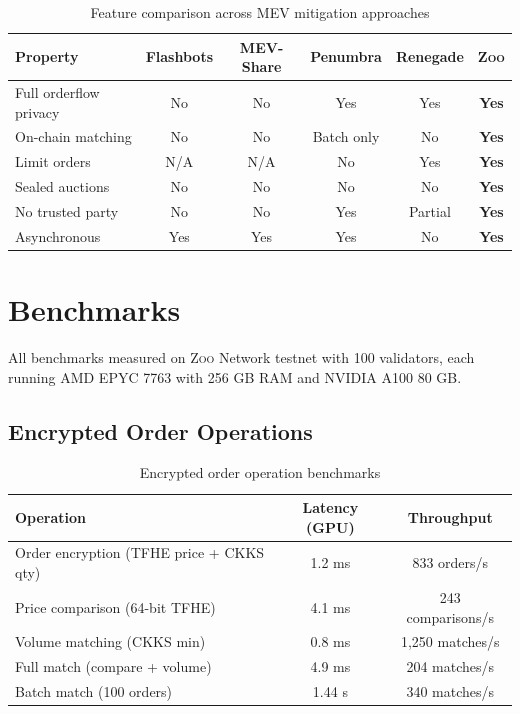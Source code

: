 \documentclass[11pt,letterpaper]{article}
\theoremstyle{definition}
\theoremstyle{remark}
\newcommand{\Zoo}{\textsc{Zoo}}
\newcommand{\MEV}{\textsc{MEV}}
\begin{document}
\begin{table}[h]
\centering
\small
\begin{tabular}{lccccc}
\toprule
\textbf{Property} & \textbf{Flashbots} & \textbf{MEV-Share} & \textbf{Penumbra} & \textbf{Renegade} & \textbf{\Zoo{}} \\
\midrule
Full orderflow privacy & No & No & Yes & Yes & \textbf{Yes} \\
On-chain matching & No & No & Batch only & No & \textbf{Yes} \\
Limit orders & N/A & N/A & No & Yes & \textbf{Yes} \\
Sealed auctions & No & No & No & No & \textbf{Yes} \\
No trusted party & No & No & Yes & Partial & \textbf{Yes} \\
Asynchronous & Yes & Yes & Yes & No & \textbf{Yes} \\
\bottomrule
\end{tabular}
\caption{Feature comparison across \MEV{} mitigation approaches}
\label{tab:feature_comparison}
\end{table}

\section{Benchmarks}
\label{sec:benchmarks}

All benchmarks measured on \Zoo{} Network testnet with 100 validators, each running AMD EPYC 7763 with 256 GB RAM and NVIDIA A100 80 GB.

\subsection{Encrypted Order Operations}

\begin{table}[h]
\centering
\begin{tabular}{lcc}
\toprule
\textbf{Operation} & \textbf{Latency (GPU)} & \textbf{Throughput} \\
\midrule
Order encryption (TFHE price + CKKS qty) & 1.2 ms & 833 orders/s \\
Price comparison (64-bit TFHE) & 4.1 ms & 243 comparisons/s \\
Volume matching (CKKS min) & 0.8 ms & 1,250 matches/s \\
Full match (compare + volume) & 4.9 ms & 204 matches/s \\
Batch match (100 orders) & 1.44 s & 340 matches/s \\
\bottomrule
\end{tabular}
\caption{Encrypted order operation benchmarks}
\label{tab:order_bench}
\end{table}
\end{document}
